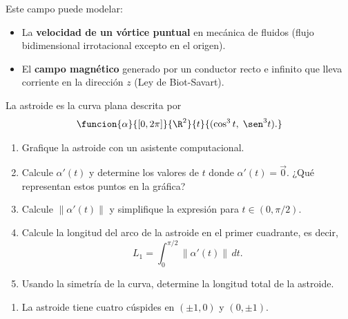 \documentclass[11pt,respuestas,a4]{aleph-examen}
\begin{document}
\begin{preguntas}
\begin{respuesta}
\begin{enumerate}
    Este campo puede modelar:
    \begin{itemize}
        \item La \textbf{velocidad de un vórtice puntual} en mecánica de fluidos (flujo bidimensional irrotacional excepto en el origen).
        \item El \textbf{campo magnético} generado por un conductor recto e infinito que lleva corriente en la dirección $z$ (Ley de Biot-Savart).
    \end{itemize}
\end{enumerate}
\end{respuesta}

\item
La {astroide} es la curva plana descrita por
\[
    \funcion{\alpha}{[0,2\pi]}{\R^2}{t}{(\cos^3 t,\;\sen^3 t).}
\]
\begin{enumerate}
    \item Grafique la astroide con un asistente computacional. 
    \item Calcule $\alpha'(t)$ y determine los valores de $t$ donde $\alpha'(t)=\vec{0}$. ¿Qué representan estos puntos en la gráfica?
    \item Calcule $\|\alpha'(t)\|$ y simplifique la expresión para $t\in(0,\pi/2)$.
    \item Calcule la longitud del arco de la astroide en el primer cuadrante, es decir,
    \[
        L_1 = \int_0^{\pi/2}\|\alpha'(t)\|\,dt.
    \]
    \item Usando la simetría de la curva, determine la longitud total de la astroide.
\end{enumerate}

\begin{respuesta}\hspace{0pt}
\begin{enumerate}
    \item La astroide tiene cuatro cúspides en $(\pm1,0)$ y $(0,\pm1)$.
    \begin{center}
    \end{center}


\end{enumerate}
\end{respuesta}
\end{preguntas}
\end{document}
